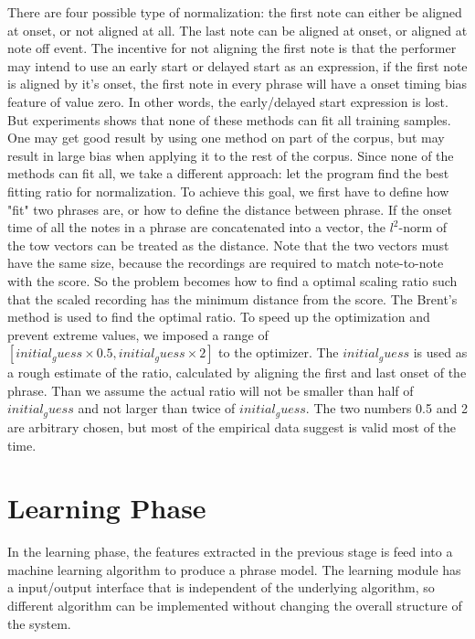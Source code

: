    There are four possible type of normalization: the first note can either be aligned at onset, or not aligned at all. The last note can be aligned at onset, or aligned at note off event.  The incentive for not aligning the first note is that the performer may intend to use an early start or delayed start as an expression, if the first note is aligned by it's onset, the first note in every phrase will have a onset timing bias feature of value zero. In other words, the early/delayed start expression is lost. %
   But experiments shows that none of these methods can fit all training samples. One may get good result by using one method on part of the corpus, but may result in large bias when applying it to the rest of the corpus. Since none of the methods can fit all, we take a different approach: let the program find the best fitting ratio for normalization. To achieve this goal, we first have to define how "fit" two phrases are, or how to define the distance between phrase. If the onset time of all the notes in a phrase are concatenated into a vector, the $l^2$-norm of the tow vectors can be treated as the distance. Note that the two vectors must have the same size, because the recordings are required to match note-to-note with the score. So the problem becomes how to find a optimal scaling ratio such that the scaled recording has the minimum distance from the score. The Brent's method\cite{TODO:brent1973} is used to find the optimal ratio. To speed up the optimization and prevent extreme values, we imposed a range of $[initial_guess \times 0.5 , initial_guess \times 2]$ to the optimizer. The $initial_guess$ is used as a rough estimate of the ratio, calculated by aligning the first and last onset of the phrase. Than we assume the actual ratio will not be smaller than half of $initial_guess$ and not larger than twice of $initial_guess$. The two numbers 0.5 and 2 are arbitrary chosen, but most of the empirical data suggest is valid most of the time. 




   \section{Learning Phase}
   In the learning phase, the features extracted in the previous stage is feed into a machine learning algorithm to produce a phrase model. The learning module has a input/output interface that is independent of the underlying algorithm, so different algorithm can be implemented without changing the overall structure of the system.

